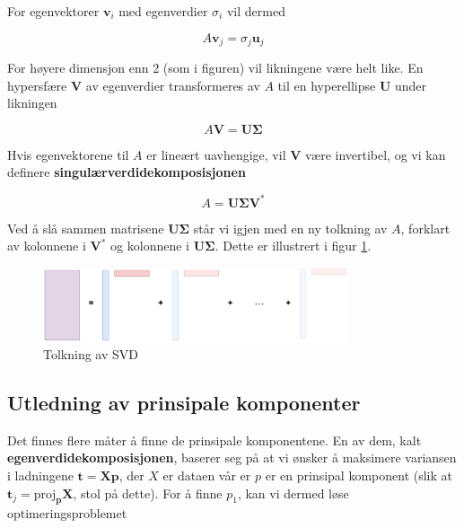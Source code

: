 For egenvektorer $\mathbf{v}_i$ med egenverdier $\sigma_i$ vil dermed

\begin{equation}
	A \mathbf{v}_j = \sigma_j \mathbf{u}_j
\end{equation}

For høyere dimensjon enn 2 (som i figuren) vil likningene være helt like. En hypersfære $\mathbf{V}$ av egenverdier transformeres av $A$ til en hyperellipse $\mathbf{U}$ under likningen

\begin{equation}
	A \mathbf{V} =\mathbf{U} \mathbf{\Sigma}
\end{equation}

Hvis egenvektorene til $A$ er lineært uavhengige, vil $\mathbf{V}$ være invertibel, og vi kan definere \textbf{singulærverdidekomposisjonen}

\begin{equation}
	A  =\mathbf{U} \mathbf{\Sigma} \mathbf{V}^*
\end{equation}

Ved å slå sammen matrisene $\mathbf{U} \mathbf{\Sigma}$ står vi igjen med en ny tolkning av $A$, forklart av kolonnene i $\mathbf{V}^*$ og kolonnene i $\mathbf{U} \mathbf{\Sigma}$. Dette er illustrert i figur \ref{fig:pca_komponentvis}.

\begin{figure}[h]
	\centering
	\includegraphics[width=0.8\textwidth]{figurer/pca_komponentvis}
	\caption{Tolkning av SVD}
	\label{fig:pca_komponentvis}
\end{figure}

\subsection{Utledning av prinsipale komponenter}
Det finnes flere måter å finne de prinsipale komponentene. En av dem, kalt \textbf{egenverdidekomposisjonen}, baserer seg på at vi ønsker å maksimere variansen i ladningene $\mathbf{t} = \mathbf{Xp}$, der $X$ er dataen vår er $p$ er en prinsipal komponent (slik at $\mathbf{t}_j = \textrm{proj}_{\mathbf{p}} \mathbf{X}$, stol på dette). For å finne $p_1$, kan vi dermed løse optimeringsproblemet

